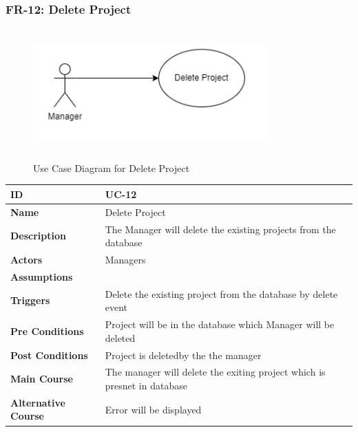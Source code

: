     \subsubsection{FR-12: Delete Project}
    \begin{figure}[H]
        \includegraphics[height=5cm, width=0.8\textwidth]{./diagrams/Use Case/u12.png}
        \centering 
        \caption{Use Case Diagram for Delete Project}
        \label{fig:Usecase1}
        \end{figure}
        
    \begin{center}
        \begin{tabularx}{\textwidth}{|l|X|}
            \hline
            \textbf{ID} & UC-12 \\
            \hline
            \textbf{Name} & Delete Project \\
            \hline
            \textbf{Description} & The Manager will delete the existing projects from the database \\
            \hline
            \textbf{Actors} & Managers \\
            \hline
            \textbf{Assumptions} &  \\
            \hline
            \textbf{Triggers} & Delete the existing project from the database by delete event \\
            \hline
            \textbf{Pre Conditions} & Project will be in the database which Manager will be deleted \\
            \hline
            \textbf{Post Conditions} & Project is deletedby the the manager \\
            \hline
            \textbf{Main Course} & The manager will delete the exiting project which is presnet in database \\
            \hline
            \textbf{Alternative Course} & Error will be displayed \\
            \hline
            
        \end{tabularx}
    \end{center}
    \newpage
    

